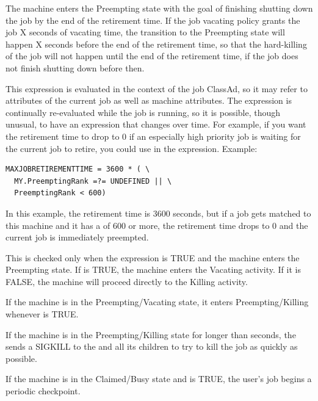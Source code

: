 \begin{description}
The machine enters the Preempting state with the goal of finishing
shutting down the job by the end of the retirement time.  If the job
vacating policy grants the job X seconds of vacating time, the
transition to the Preempting state will happen X seconds before the
end of the retirement time, so that the hard-killing of the job will not
happen until the end of the retirement time, if the job does not finish
shutting down before then.

This expression is evaluated in the context of the job ClassAd, so it
may refer to attributes of the current job as well as machine
attributes.  The expression is continually re-evaluated while the job
is running, so it is possible, though unusual, to have an expression
that changes over time.  For example, if you want the retirement time
to drop to 0 if an especially high priority job is waiting for the
current job to retire, you could use  in the
expression.  Example:

\begin{verbatim}
MAXJOBRETIREMENTTIME = 3600 * ( \
  MY.PreemptingRank =?= UNDEFINED || \
  PreemptingRank < 600)
\end{verbatim}

In this example, the retirement time is 3600 seconds, but if a job gets
matched to this machine and it has a  of 600 or more,
the retirement time drops to 0 and the current job is immediately preempted.

\item[\Macro{WANT\_VACATE}] This is checked only when the
   expression is TRUE and the machine enters the
  Preempting state.
  If \MacroNI{WANT\_VACATE} is TRUE, the machine enters the Vacating
  activity.  
  If it is FALSE, the machine will proceed directly to the Killing
  activity.  
  
\item[\Macro{KILL}] If the machine is in the Preempting/Vacating state, it
  enters Preempting/Killing whenever  is TRUE. 
  
\item[\Macro{KILLING\_TIMEOUT}] If the machine is in the
  Preempting/Killing state for longer than 
  seconds, the \Condor{startd} sends a SIGKILL to the 
  and all its children to try to kill the job as quickly as possible.
  
\item[] If the machine is in the
  Claimed/Busy state and \MacroNI{PERIODIC\_CHECKPOINT} is TRUE, the
  user's job begins a periodic checkpoint.
  

\end{description}

